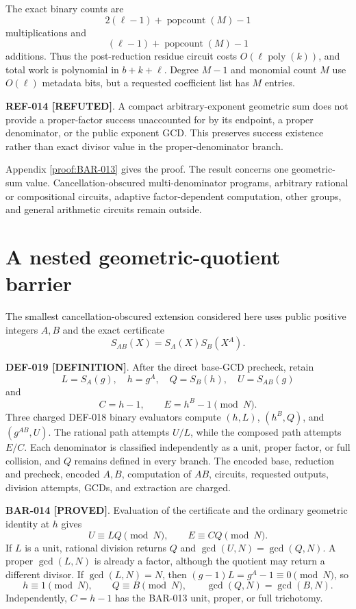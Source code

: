 \documentclass[11pt]{article}
\newcommand{\claimstatus}[2]{\textbf{#1 [#2]}}
\newcommand{\poly}{\operatorname{poly}}
\begin{document}
The exact binary counts are
\[
2(\ell-1)+\operatorname{popcount}(M)-1
\]
multiplications and
\[
(\ell-1)+\operatorname{popcount}(M)-1
\]
additions. Thus the post-reduction residue circuit costs
\(O(\ell\poly(k))\), and total work is polynomial in \(b+k+\ell\). Degree
\(M-1\) and monomial count \(M\) use \(O(\ell)\) metadata bits, but a requested
coefficient list has \(M\) entries.

\claimstatus{REF-014}{REFUTED}. A compact arbitrary-exponent geometric sum
does not provide a proper-factor success unaccounted for by its endpoint, a
proper denominator, or the public exponent GCD. This preserves success
existence rather than exact divisor value in the proper-denominator branch.

Appendix \ref{proof:BAR-013} gives the proof. The result concerns one
geometric-sum value. Cancellation-obscured multi-denominator programs,
arbitrary rational or compositional circuits, adaptive factor-dependent
computation, other groups, and general arithmetic circuits remain outside.

\section{A nested geometric-quotient barrier}

The smallest cancellation-obscured extension considered here uses public
positive integers \(A,B\) and the exact certificate
\[
S_{AB}(X)=S_A(X)S_B(X^A).
\]

\claimstatus{DEF-019}{DEFINITION}. After the direct base-GCD precheck, retain
\[
L=S_A(g),\quad h=g^A,\quad Q=S_B(h),\quad U=S_{AB}(g)
\]
and
\[
C=h-1,\qquad E=h^B-1\pmod N.
\]
Three charged DEF-018 binary evaluators compute \((h,L)\), \((h^B,Q)\), and
\((g^{AB},U)\). The rational path attempts \(U/L\), while the composed path
attempts \(E/C\). Each denominator is classified independently as a unit,
proper factor, or full collision, and \(Q\) remains defined in every branch.
The encoded base, reduction and precheck, encoded \(A,B\), computation of
\(AB\), circuits, requested outputs, division attempts, GCDs, and extraction
are charged.

\claimstatus{BAR-014}{PROVED}. Evaluation of the certificate and the ordinary
geometric identity at \(h\) gives
\[
U\equiv LQ\pmod N,\qquad E\equiv CQ\pmod N.
\]
If \(L\) is a unit, rational division returns \(Q\) and
\(\gcd(U,N)=\gcd(Q,N)\). A proper \(\gcd(L,N)\) is already a factor, although
the quotient may return a different divisor. If \(\gcd(L,N)=N\), then
\((g-1)L=g^A-1\equiv0\pmod N\), so
\[
h\equiv1\pmod N,\qquad Q\equiv B\pmod N,\qquad
\gcd(Q,N)=\gcd(B,N).
\]
Independently, \(C=h-1\) has the BAR-013 unit, proper, or full trichotomy.
\end{document}
